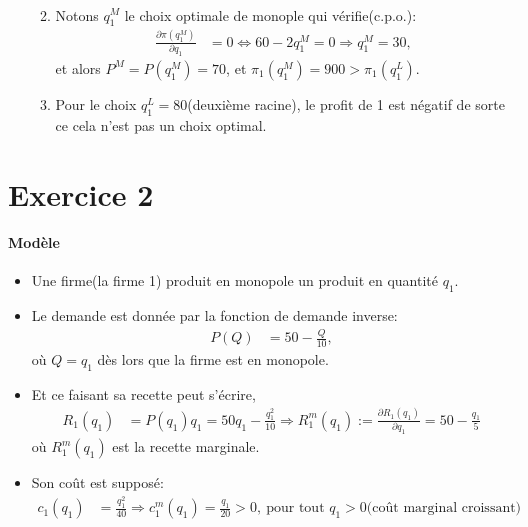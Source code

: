\begin{frame}[allowframebreaks]{\insertsection}
\begin{itemize}
\begin{enumerate}[-]
\begin{align*}
            \end{align*}
            \item Notons $q_1^M$ le choix optimale de monople qui vérifie(c.p.o.): 
            \begin{align*}
                \frac{\partial \pi(q_1^M)}{\partial q_1} &= 0 \Leftrightarrow 60-2q_1^M = 0\Rightarrow q_1^M = 30,
            \end{align*}
            et alors $P^M=P(q_1^M) = 70$, et $\pi_1(q_1^M) = 900 > \pi_1(q_1^L)$.
            \item Pour le choix $q_1^L = 80$(deuxième racine), le profit de 1 est négatif de sorte ce cela n'est pas un choix optimal.
        \end{enumerate}
    \end{itemize}
    \end{frame}
    
\section{Exercice 2}
\frame{\sectionpage}
\begin{frame}[allowframebreaks]{\insertsection}
\framesubtitle{Modèle}
\begin{itemize}
\item Une firme(la firme 1) produit en monopole un produit en quantité $q_1$.
\item Le demande est donnée par la fonction de demande inverse: 
\begin{align*}
    P(Q) &= 50 - \frac{Q}{10}, 
\end{align*}
où $Q = q_1$ dès lors que la firme est en monopole.
\item Et ce faisant sa recette peut s'écrire,
\begin{align}
    R_1(q_1) &= P(q_1)q_1 = 50q_1- \frac{q_1^2}{10} \Rightarrow R^m_1(q_1) := \frac{\partial R_1(q_1)}{\partial q_1} = 50-\frac{q_1}{5}
\label{eq8}
\end{align}
où $R^m_1(q_1)$ est la recette marginale.
\item Son coût est supposé:
\begin{align}
    c_1(q_1) &= \frac{q_1^2}{40} \Rightarrow c^m_1(q_1) = \frac{q_1}{20} > 0, \ \text{pour tout \ $q_1>0$(coût marginal croissant)}
\label{eq9}
\end{align}
\end{itemize}
    \end{frame}

